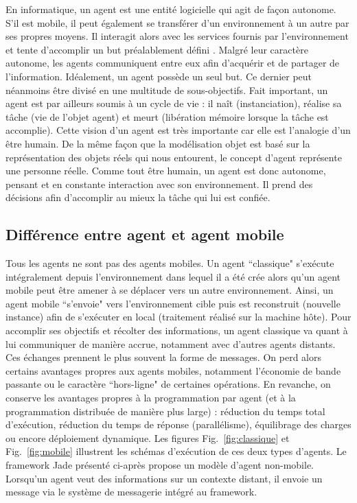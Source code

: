 \documentclass[conference]{IEEEtran}
\begin{document}
En informatique, un agent est une entité logicielle qui agit de façon autonome. S'il est mobile, il peut également se transférer d'un environnement à un autre par ses propres moyens. Il interagit alors avec les services fournis par l'environnement et tente d'accomplir un but préalablement défini \cite{gray}. Malgré leur caractère autonome, les agents communiquent entre eux afin d'acquérir et de partager de l'information. Idéalement, un agent possède un seul but. Ce dernier peut néanmoins être divisé en une multitude de sous-objectifs. Fait important, un agent est par ailleurs soumis à un cycle de vie : il naît (instanciation), réalise sa tâche (vie de l'objet agent) et meurt (libération mémoire lorsque la tâche est accomplie). Cette vision d'un agent est très importante car elle est l'analogie d'un être humain. De la même façon que la modélisation objet est basé sur la représentation des objets réels qui nous entourent, le concept d'agent représente une personne réelle. Comme tout être humain, un agent est donc autonome, pensant et en constante interaction avec son environnement. Il prend des décisions afin d'accomplir au mieux la tâche qui lui est confiée.\\

\subsection{Différence entre agent et agent mobile}
\vspace*{1mm}

Tous les agents ne sont pas des agents mobiles. Un agent ``classique" s'exécute intégralement depuis l'environnement dans lequel il a été crée alors qu'un agent mobile peut être amener à se déplacer vers un autre environnement. Ainsi, un agent mobile ``s'envoie" vers l'environnement cible puis est reconstruit (nouvelle instance) afin de s'exécuter en local (traitement réalisé sur la machine hôte). Pour accomplir ses objectifs et récolter des informations, un agent classique va quant à lui communiquer de manière accrue, notamment avec d'autres agents distants. Ces échanges prennent le plus souvent la forme de messages. On perd alors certains avantages propres aux agents mobiles, notamment l'économie de bande passante ou le caractère ``hors-ligne" de certaines opérations. En revanche, on conserve les avantages propres à la programmation par agent (et à la programmation distribuée de manière plus large) : réduction du temps total d'exécution, réduction du temps de réponse (parallélisme), équilibrage des charges ou encore déploiement dynamique. Les figures Fig.~\ref{fig:classique} et Fig.~\ref{fig:mobile} illustrent les schémas d'exécution de ces deux types d'agents. Le framework Jade présenté ci-après propose un modèle d'agent non-mobile. Lorsqu'un agent veut des informations sur un contexte distant, il envoie un message via le système de messagerie intégré au framework.\\
\end{document}
